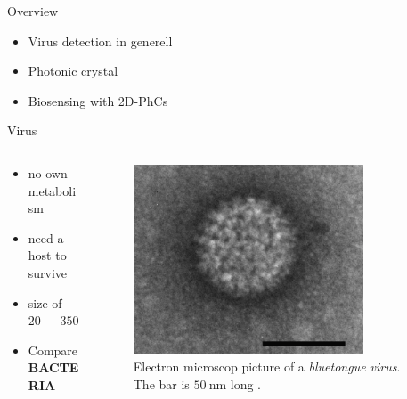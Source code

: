 


\frame{\maketitle}


\begin{frame}{Overview}
\begin{itemize}
  \setlength\itemsep{1.2em}
  \item{Virus detection in generell}
  \item{Photonic crystal}
  \item{Biosensing with 2D-PhCs}
\end{itemize}

\end{frame}

\begin{frame}{Virus}
  \begin{columns}

  \begin{column}{0.49\textwidth}
    \begin{itemize}
      \setlength\itemsep{1.2em}
      \item{no own metabolism}
      \item{need a host to survive} %
      \item{size of $\num{20}\,-\, \num{350}\,\si{\nano\meter}$}
      \item{Compare \textbf{BACTERIA}}
    \end{itemize}
  \end{column}

  \begin{column}{0.49\textwidth}
    \begin{figure}
      \centering
      \includegraphics[width=0.8\textwidth]{./bilder/virus.png}
      \caption{Electron microscop picture of a \emph{bluetongue virus}. The bar is $\SI{50}{\nano\meter}$ long \cite{virus}.}
      \label{fig: 2d_photonic_crystal}
    \end{figure}
  \end{column}

  \end{columns}
\end{frame}

